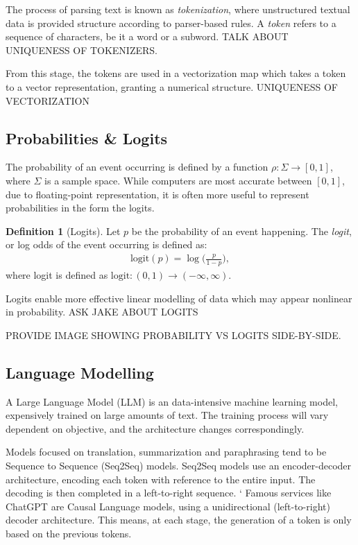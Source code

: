 \documentclass{l4proj}
\theoremstyle{definition}
\newtheorem{definition}{Definition}[section]
\begin{document}
        The process of parsing text is known as \textit{tokenization}, where unstructured textual data is provided structure according to parser-based rules. A \textit{token} refers to a sequence of characters, be it a word or a subword. TALK ABOUT UNIQUENESS OF TOKENIZERS. 
        
        From this stage, the tokens are used in a vectorization map which takes a token to a vector representation, granting a numerical structure. UNIQUENESS OF VECTORIZATION  
        
    \subsection{Probabilities \& Logits}
        The probability of an event occurring is defined by a function $\rho: \Sigma \rightarrow [0,1]$, where $\Sigma$ is a sample space. While computers are most accurate between $[0,1]$, due to floating-point representation, it is often more useful to represent probabilities in the form the logits.

        \begin{definition}[Logits]
            Let $p$ be the probability of an event happening. The \textit{logit}, or log odds of the event occurring is defined as: 
            \begin{align}
                \text{logit}(p) = \log\bigg(\frac{p}{1-p}\bigg),
            \end{align}
            where logit is defined as $\text{logit}: (0,1) \rightarrow (-\infty, \infty)$.
        \end{definition}
        
        Logits enable more effective linear modelling of data which may appear nonlinear in probability. ASK JAKE ABOUT LOGITS

        PROVIDE IMAGE SHOWING PROBABILITY VS LOGITS SIDE-BY-SIDE.

    \subsection{Language Modelling}
        A Large Language Model (LLM) is an data-intensive machine learning model, expensively trained on large amounts of text. The training process will vary dependent on objective, and the architecture changes correspondingly.

        Models focused on translation, summarization and paraphrasing tend to be Sequence to Sequence (Seq2Seq) models. Seq2Seq models use an encoder-decoder architecture, encoding each token with reference to the entire input. The decoding is then completed in a left-to-right sequence.
`
        Famous services like ChatGPT are Causal Language models, using a unidirectional (left-to-right) decoder architecture. This means, at each stage, the generation of a token is only based on the previous tokens. 
\end{document}
